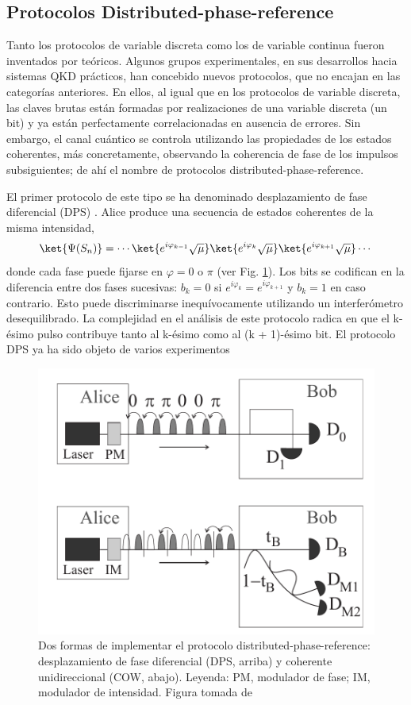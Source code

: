 \documentclass[a4paper,11pt]{book} %
\numberwithin{equation}{chapter}
\begin{document}
		\subsection{Protocolos Distributed-phase-reference} \label{subsec_QKD_phase}
		
Tanto los protocolos de variable discreta como los de variable continua fueron inventados por teóricos. Algunos grupos experimentales, en sus desarrollos hacia sistemas QKD prácticos, han concebido nuevos protocolos, que no encajan en las categorías anteriores. En ellos, al igual que en los protocolos de variable discreta, las claves brutas están formadas por realizaciones de una variable discreta (un bit) y ya están perfectamente correlacionadas en ausencia de errores. Sin embargo, el canal cuántico se controla utilizando las propiedades de los estados coherentes, más concretamente, observando la coherencia de fase de los impulsos subsiguientes; de ahí el nombre de protocolos distributed-phase-reference.

El primer protocolo de este tipo se ha denominado desplazamiento de fase diferencial (DPS) \cite{bib_Phase_Inoue_2002,bib_Phase_Inoue_2003}. Alice produce una secuencia de estados coherentes de la misma intensidad,
	\begin{equation}
	\ket{ \Psi (S_n)} = \cdots \ket{e^{i \varphi_{k-1}} \sqrt{\mu}} \ket{e^{i \varphi_k} \sqrt{\mu}} \ket{e^{i \varphi_{k+1}} \sqrt{\mu}} \cdots
	\end{equation}
donde cada fase puede fijarse en $\varphi = 0$ o $\pi$ (ver Fig. \ref{Fig_QKD_DFR}). Los bits se codifican en la diferencia entre dos fases sucesivas: $b_k = 0$ si $e^{i \varphi_k} = e^{i \varphi_{k+1}}$ y $b_k = 1$ en caso contrario. Esto puede discriminarse inequívocamente utilizando un interferómetro desequilibrado. La complejidad en el análisis de este protocolo radica en que el k-ésimo pulso contribuye tanto al k-ésimo como al (k + 1)-ésimo bit. El protocolo DPS ya ha sido objeto de varios experimentos \cite{bib_QKD_DFR_Takesue_2005,bib_QKD_DFR_Takesue_2007,bib_QKD_DFR_Diamanti_2006}

	\begin{figure}[t]
	\centering 
	\includegraphics[width=0.6\linewidth]{Figuras/Fig_QKD_DFR.png}
	\caption{Dos formas de implementar el protocolo distributed-phase-reference: desplazamiento de fase diferencial (DPS, arriba) y coherente unidireccional (COW, abajo). Leyenda: PM, modulador de fase; IM, modulador de intensidad. Figura tomada de \cite{bib_QKD_resumen}}
	\label{Fig_QKD_DFR}
	\end{figure}
\end{document}
